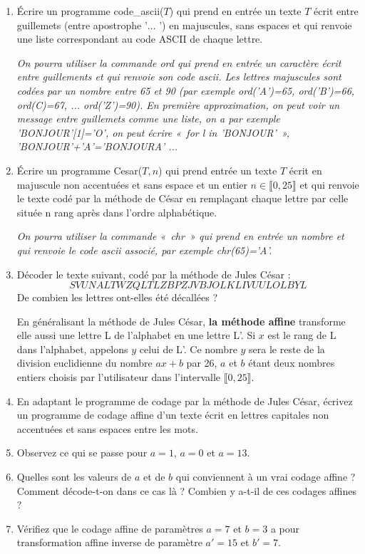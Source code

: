 \documentclass[11pt,a4paper]{article}
\begin{document}
\begin{enumerate}

\item Écrire un programme code\_ascii($T$) qui prend en entrée un texte $T$ écrit entre guillemets (entre apostrophe '$\ldots$
') en majuscules, sans espaces et qui renvoie une liste correspondant au code ASCII de chaque lettre. 

\textit{On pourra utiliser la commande ord qui prend en entrée un caractère écrit entre guillements et qui renvoie son  code ascii. Les lettres majuscules sont codées par un nombre entre 65 et 90 (par exemple ord('A')=65, ord('B')=66, ord(C)=67, ... ord('Z')=90). En première approximation, on peut voir un message entre guillemets comme une liste, on a par exemple 'BONJOUR'[1]='O', on peut écrire «~for l in 'BONJOUR'~», 'BONJOUR'+'A'='BONJOURA' ...}



\item Écrire un  programme Cesar($T,n$) qui prend entrée un texte $T$ écrit en majuscule non accentuées et sans espace et un entier $n\in \llbracket 0,25\rrbracket$ et qui renvoie le texte codé par la méthode de César en remplaçant chaque lettre par celle située n rang après dans l'ordre alphabétique.

\textit{On pourra utiliser la commande «~chr~» qui prend en entrée un nombre et qui renvoie le code ascii associé, par exemple chr(65)='A'.}


\item Décoder le texte suivant, codé par la méthode de Jules César :
$$  SVUNALTWZQLTLZBPZJVBJOLKLIVUULOLBYL    $$ De combien les lettres ont-elles été décallées ?


En généralisant la méthode de Jules César, \textbf{la méthode affine} transforme elle aussi une lettre L de l'alphabet en une lettre L'. Si $x$ est le rang de L dans l'alphabet, appelons $y$ celui de L'. Ce nombre $y$ sera le reste de la division euclidienne du nombre $ax+b$ par 26, $a$ et $b$ étant deux nombres entiers choisis par l'utilisateur dans l'intervalle $\llbracket 0,25\rrbracket$.

\item En adaptant le programme de codage par la méthode de Jules César, écrivez un programme de codage affine d'un texte écrit en lettres capitales non accentuées et sans espaces entre les mots.
\item Observez ce qui se passe pour $a=1$, $a=0$ et $a=13$.
\item Quelles sont les valeurs de $a$ et de $b$ qui conviennent à un vrai codage affine ? Comment décode-t-on dans ce cas là ? Combien y a-t-il de ces codages affines ?
\item Vérifiez que le codage affine de paramètres $a=7$ et $b=3$ a pour transformation affine inverse de paramètre $a'=15$ et $b'=7$.


\end{enumerate}
\end{document}
